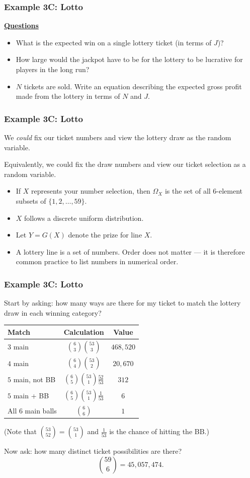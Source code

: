 \documentclass[t,8pt]{beamer}
\begin{document}
\begin{frame}
	\frametitle{Example 3C: Lotto}
	{\bf\underline{Questions}} \par
	\begin{itemize}
		\item What is the expected win on a single lottery ticket (in terms of $J$)?
		\item How large would the jackpot have to be for the lottery to be lucrative for players in the long run?
		\item $N$ tickets are sold. Write an equation describing the expected gross profit made from the lottery in terms of $N$ and $J$.
	\end{itemize}
\end{frame}

\begin{frame}
	\frametitle{Example 3C: Lotto}
	We \emph{could} fix our ticket numbers and view the lottery draw as the random variable. \par
	Equivalently, we could fix the draw numbers and view our ticket selection as a random variable.
	\begin{itemize}
		\item If $X$ represents your number selection, then $\Omega_X$ is the set of all $6$-element subsets of $\{1,2,\dots,59\}$.
		\item $X$ follows a discrete uniform distribution.
		\item Let $Y=G(X)$ denote the prize for line $X$.
		\item A lottery line is a set of numbers. Order does not matter — it is therefore common practice to list numbers in numerical order.
	\end{itemize}
\end{frame}

\begin{frame}
	\frametitle{Example 3C: Lotto}
	Start by asking: how many ways are there for my ticket to match the lottery draw in each winning category?
	\begin{table}
		\centering
		\begin{tabular}{|l|c|c|}
			\hline 
			Match & Calculation & Value \\ \hline
			$3$ main & $\binom{6}{3}\binom{53}{3}$ & $468{,}520$ \\
			$4$ main & $\binom{6}{4}\binom{53}{2}$ & $20{,}670$ \\
			$5$ main, not BB & $\binom{6}{5}\binom{53}{1}\frac{52}{53}$ & $312$ \\
			$5$ main + BB & $\binom{6}{5}\binom{53}{1}\frac{1}{53}$ & $6$ \\
			All $6$ main balls & $\binom{6}{6}$ & $1$ \\ \hline
		\end{tabular}
	\end{table}
	(Note that $\binom{53}{52}=\binom{53}{1}$ and $\frac{1}{53}$ is the chance of hitting the BB.) \par
	Now ask: how many distinct ticket possibilities are there?
	$${59\choose 6}=45{,}057{,}474.$$
\end{frame}
\end{document}
